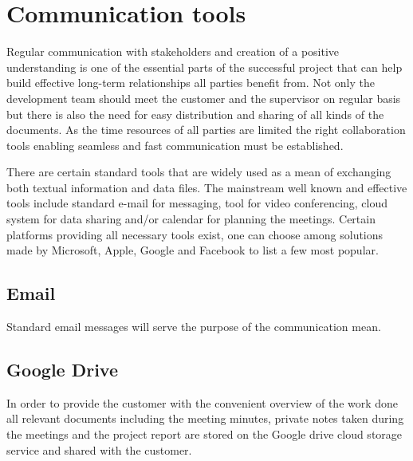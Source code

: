 


\section{Communication tools} \label{sec:communication_tools}
Regular communication with stakeholders and creation of a positive understanding is one of the essential parts of the successful project that can help build effective long-term relationships all parties benefit from. 
Not only the development team should meet the customer and the supervisor on regular basis but there is also the need for easy distribution and sharing of all kinds of the documents. 
As the time resources of all parties are limited the right collaboration tools enabling seamless and fast communication must be established.

There are certain standard tools that are widely used as a mean of exchanging both textual information and data files. 
The mainstream well known and effective tools include standard e-mail for messaging, tool for video conferencing, cloud system for data sharing and/or calendar for planning the meetings. 
Certain platforms providing all necessary tools exist, one can choose among solutions made by Microsoft, Apple, Google and Facebook to list a few most popular.


\subsection{Email}
Standard email messages will serve the purpose of the communication mean.


\subsection{Google Drive}
In order to provide the customer with the convenient overview of the work done all relevant documents including the meeting minutes, private notes taken during the meetings and the project report are stored on the Google drive cloud storage service and shared with the customer.

